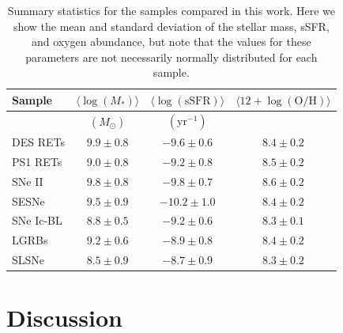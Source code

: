 \documentclass[fleqn,usenatbib,]{mnras}
\begin{document}
\begin{table}
    \centering
    \caption{Summary statistics for the samples compared in this work. Here we show the mean and standard deviation of the stellar mass, sSFR, and oxygen abundance, but note that the values for these parameters are not necessarily normally distributed for each sample. }
    \begin{tabular}{lccc}
    \toprule
   Sample & $\langle\log \left(M_*\right)\rangle$ &  $\langle\log \left(\mathrm{sSFR}\right)\rangle$ &$\langle12+\log\left(\mathrm{O/H}\right) \rangle$\\
   \midrule
   {} & $\left( M_{\odot}\right)$ & $\left(\mathrm{yr}^{-1} \right)$& \\
   \midrule
  DES RETs &$9.9 \pm 0.8$ & $-9.6 \pm 0.6 $ &$ 8.4 \pm 0.2$ \\
PS1 RETs &$9.0 \pm 0.8$ & $-9.2 \pm 0.8 $ &$ 8.5 \pm 0.2$ \\
SNe II &$9.8 \pm 0.8$ & $-9.8 \pm 0.7 $ &$ 8.6 \pm 0.2$ \\
SESNe &$9.5 \pm 0.9$ & $-10.2 \pm 1.0 $ &$ 8.4 \pm 0.2$ \\
SNe Ic-BL &$8.8 \pm 0.5$ & $-9.2 \pm 0.6 $ &$ 8.3 \pm 0.1$ \\
LGRBs &$9.2 \pm 0.6$ & $-8.9 \pm 0.8 $ &$ 8.4 \pm 0.2$ \\
SLSNe &$8.5 \pm 0.9$ & $-8.7 \pm 0.9 $ &$ 8.3 \pm 0.2$ \\
\bottomrule
    \end{tabular}
    
    \label{tab:summary}
\end{table}

\section{Discussion }
\label{sec:discussion}
\end{document}
